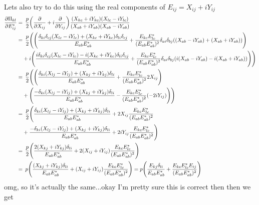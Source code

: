 \documentclass{article}
\newcommand{\YY}[3][j]{E_{#2#1}E_{#3#1}^*}
\begin{document}
{{    Lets also try to do this using the real components of $E_{ij} = X_{ij} + i Y_{ij}$
    \begin{align}
        \pdv{\Pi_{kl}}{E_{ij}^*} =&\enspace \frac{p}{2} \qty(\pdv{X_{ij}} + i\pdv{Y_{ij}}) \frac{(X_{kc} + iY_{kc})(X_{lc} - iY_{lc})}{(X_{ab} + iY_{ab})(X_{ab} - iY_{ab})} \\
        =&\enspace \frac{p}{2} \Biggl(\Biggl(\frac{\delta_{ki}\delta_{cj}(X_{lc} - iY_{lc}) + (X_{kc} + iY_{kc})\delta_{li}\delta_{cj}}{\YY[b]{a}{a}} + \frac{\YY[c]{k}{l}}{(\YY[b]{a}{a})^2}\delta_{ai}\delta_{bj}\qty((X_{ab}-iY_{ab}) + (X_{ab} + iY_{ab})) \Biggr) \\
        &+ i\Biggl( \frac{i\delta_{ki}\delta_{cj}(X_{lc} - iY_{lc}) - i(X_{kc} + iY_{kc})\delta_{li}\delta_{cj}}{\YY[b]{a}{a}} + \frac{\YY[c]{k}{l}}{(\YY[b]{a}{a})^2}\delta_{ai}\delta_{bj}\qty(i(X_{ab}-iY_{ab}) - i(X_{ab} + iY_{ab})) \Biggr) \Biggr) \\
        =&\enspace \frac{p}{2} \Biggl(\Biggl(\frac{\delta_{ki}(X_{lj} - iY_{lj}) + (X_{kj} + iY_{kj})\delta_{li}}{\YY[b]{a}{a}} + \frac{\YY[c]{k}{l}}{(\YY[b]{a}{a})^2}2X_{ij} \Biggr) \\
        &+ \Biggl( \frac{-\delta_{ki}(X_{lj} - iY_{lj}) + (X_{kj} + iY_{kj})\delta_{li}}{\YY[b]{a}{a}} - \frac{\YY[c]{k}{l}}{(\YY[b]{a}{a})^2}\qty(-2iY_{ij}) \Biggr) \Biggr) \\
        =&\enspace \frac{p}{2} \Biggl(\frac{\delta_{ki}(X_{lj} - iY_{lj}) + (X_{kj} + iY_{kj})\delta_{li}}{\YY[b]{a}{a}} + 2X_{ij}\frac{\YY[c]{k}{l}}{(\YY[b]{a}{a})^2} \\
        &+ \frac{-\delta_{ki}(X_{lj} - iY_{lj}) + (X_{kj} + iY_{kj})\delta_{li}}{\YY[b]{a}{a}} + 2iY_{ij}\frac{\YY[c]{k}{l}}{(\YY[b]{a}{a})^2} \Biggr) \\
        =&\enspace \frac{p}{2} \Biggl(\frac{2(X_{kj} + iY_{kj})\delta_{li}}{\YY[b]{a}{a}} + 2(X_{ij} + iY_{ij})\frac{\YY[c]{k}{l}}{(\YY[b]{a}{a})^2} \Biggr) \\
        =&\enspace p \Biggl(\frac{(X_{kj} + iY_{kj})\delta_{li}}{\YY[b]{a}{a}} + (X_{ij} + iY_{ij})\frac{\YY[c]{k}{l}}{(\YY[b]{a}{a})^2} \Biggr) = p \Biggl(\frac{E_{kj}\delta_{li}}{\YY[b]{a}{a}} + \frac{\YY[c]{k}{l}E_{ij}}{(\YY[b]{a}{a})^2}\Biggr)
    \end{align}
    omg, so it's actually the same...okay I'm pretty sure this is correct then
}}
then we get
\end{document}
